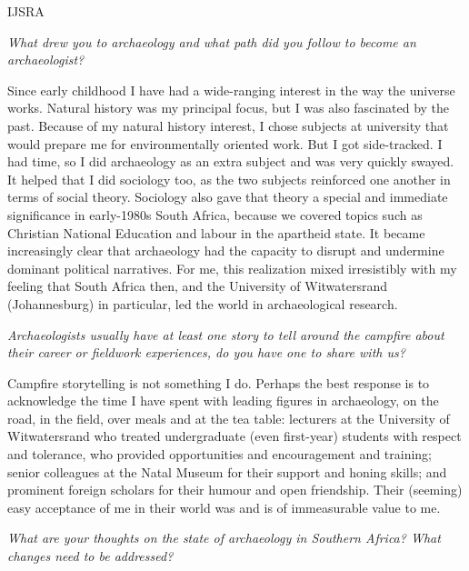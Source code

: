 \begin{labeling}{IJSRA}	
\item[IJSRA (International Journal of Student Research in Archaeology)] \emph{What drew you to archaeology and what path did you follow to become an archaeologist?}
	
\item[Gavin Whitelaw (GW)]
Since early childhood I have had a wide-ranging interest in the way the universe works. Natural history was my principal focus, but I was also fascinated by the past. Because of my natural history interest, I chose subjects at university that would prepare me for environmentally oriented work. But I got side-tracked. I had time, so I did archaeology as an extra subject and was very quickly swayed. It helped that I did sociology too, as the two subjects reinforced one another in terms of social theory. Sociology also gave that theory a special and immediate significance in early-1980s South Africa, because we covered topics such as Christian National Education and labour in the apartheid state. It became increasingly clear that archaeology had the capacity to disrupt and undermine dominant political narratives. For me, this realization mixed irresistibly with my feeling that South Africa then, and the University of Witwatersrand (Johannesburg) in particular, led the world in archaeological research.


\item[IJSRA] \emph{Archaeologists usually have at least one story to tell around the campfire about their career or fieldwork experiences, do you have one to share with us?}
	
\item[GW]
Campfire storytelling is not something I do. Perhaps the best response is to acknowledge the time I have spent with leading figures in archaeology, on the road, in the field, over meals and at the tea table: lecturers at the University of Witwatersrand who treated undergraduate (even first-year) students with respect and tolerance, who provided opportunities and encouragement and training; senior colleagues at the Natal Museum for their support and honing skills; and prominent foreign scholars for their humour and open friendship. Their (seeming) easy acceptance of me in their world was and is of immeasurable value to me.


\item[IJSRA] \emph{What are your thoughts on the state of archaeology in Southern Africa? What changes need to be addressed?}
	

\end{labeling}
